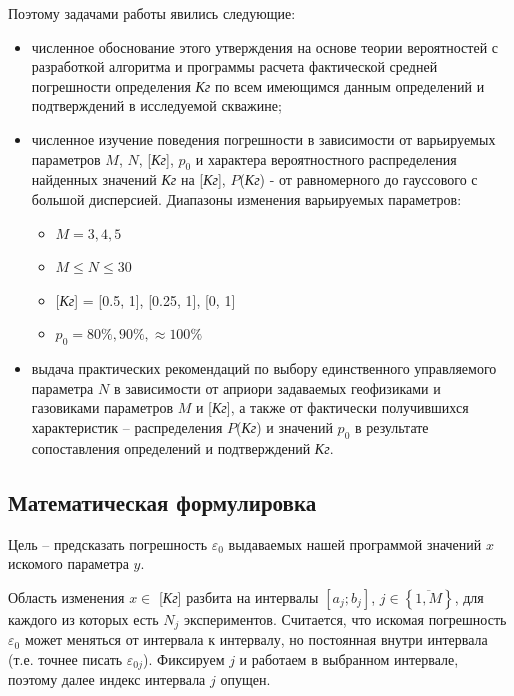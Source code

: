 \documentclass[a4paper,12pt]{article} %
\begin{document}
Поэтому задачами работы явились следующие:

\begin{itemize}
\item численное обоснование этого утверждения на основе теории вероятностей с разработкой алгоритма и программы расчета фактической средней погрешности определения \emph{Кг} по всем имеющимся данным определений и подтверждений в исследуемой скважине;

\item численное изучение поведения погрешности в зависимости от варьируемых параметров $M$, $N$, [\emph{Кг}], $p_0$ и характера вероятностного  распределения найденных значений \emph{Кг} на  [\emph{Кг}], $P$(\emph{Кг}) - от равномерного до гауссового с большой дисперсией. Диапазоны изменения варьируемых параметров: 

\begin{itemize}
\item $M = 3, 4, 5$
\item $M \leq N \leq 30$
\item $ $[\emph{Кг}] = [0.5, 1], [0.25, 1], [0, 1]
\item $p_0 = 80\%, 90\%, \approx 100\%$
\end{itemize}

\item выдача практических рекомендаций по выбору единственного управляемого параметра $N$ в зависимости от априори задаваемых геофизиками и газовиками параметров $M$  и [\emph{Кг}], а также от фактически получившихся характеристик – распределения $P$(\emph{Кг})  и значений $p_0$ в результате сопоставления определений и подтверждений \emph{Кг}.

\end{itemize}

\subsection{Математическая формулировка}

Цель -- предсказать погрешность $\varepsilon_0$ выдаваемых нашей программой значений $x$ искомого параметра $y$.

Область изменения $x \in $ [\emph{Кг}] разбита на интервалы $[a_j; b_j]$, $j \in \left\{\overline{1,M}\right\}$, для каждого из которых есть $N_j$ экспериментов. Считается, что искомая погрешность $\varepsilon_0$ может меняться от интервала к интервалу, но постоянная внутри интервала (т.е. точнее писать $\varepsilon_{0j}$). Фиксируем $j$ и работаем в выбранном интервале, поэтому далее индекс интервала $j$ опущен.
\end{document}
